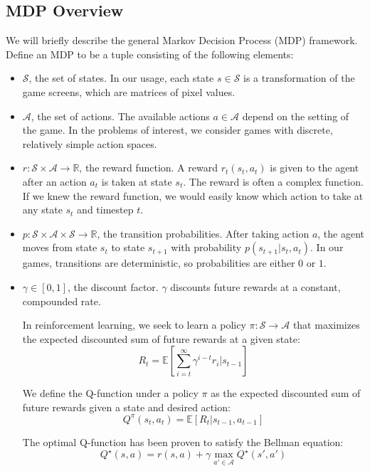 \documentclass[11pt]{article}
\begin{document}
\subsection{MDP Overview}

We will briefly describe the general Markov Decision Process (MDP)
framework. Define an MDP to be a tuple consisting of the following elements:

\begin{itemize}
    \item $\mathcal{S}$, the set of states. In our usage, each state $s \in \mathcal{S}$ is a transformation of the game screens, which are matrices of pixel values.
      
    \item $\mathcal{A}$, the set of actions. The available actions $a \in \mathcal{A}$
    depend on the setting of the game. In the problems of interest, we
    consider games with discrete, relatively simple action spaces.
      
    \item $r: \mathcal{S} \times \mathcal{A} \to \mathbb{R}$, the reward
    function. A reward $r_t(s_t, a_t)$ is given to the agent after an
    action $a_t$ is taken at state $s_t$. The reward is often a complex
    function. If we knew the reward function, we would easily know which
    action to take at any state $s_t$ and timestep $t$.
      
    \item $p: \mathcal{S} \times \mathcal{A} \times \mathcal{S} \to
    \mathbb{R}$, the transition probabilities. After taking action $a$, the agent moves from state $s_t$ to state $s_{t+1}$ with probability $p(s_{t+1} |s_t,
    a_t)$. In our games, transitions are deterministic, so probabilities
    are either $0$ or $1$.
      
    \item $\gamma \in [0, 1]$, the discount factor. $\gamma$ discounts
    future rewards at a constant, compounded rate.
    
    In reinforcement learning, we seek to learn a policy
    $\pi: \mathcal{S} \to \mathcal{A}$ that maximizes the expected
    discounted sum of future rewards at a given state:
    $$R_t = \mathbb{E}\left[\sum_{i=t}^\infty \gamma^{i-t} r_{i}|s_{t-1}\right]$$
    
    We define the Q-function under a policy $\pi$ as the expected
    discounted sum of future rewards given a state and desired action:
    $$Q^\pi(s_t, a_t) = \mathbb{E}\left[R_t | s_{t-1}, a_{t-1} \right]$$
    
    The optimal Q-function has been proven to satisfy the Bellman equation:
    $$Q^\star(s, a) = r(s, a) + \gamma \max_{a' \in \mathcal{A}} Q^\star(s', a')$$
\end{itemize}
\end{document}
